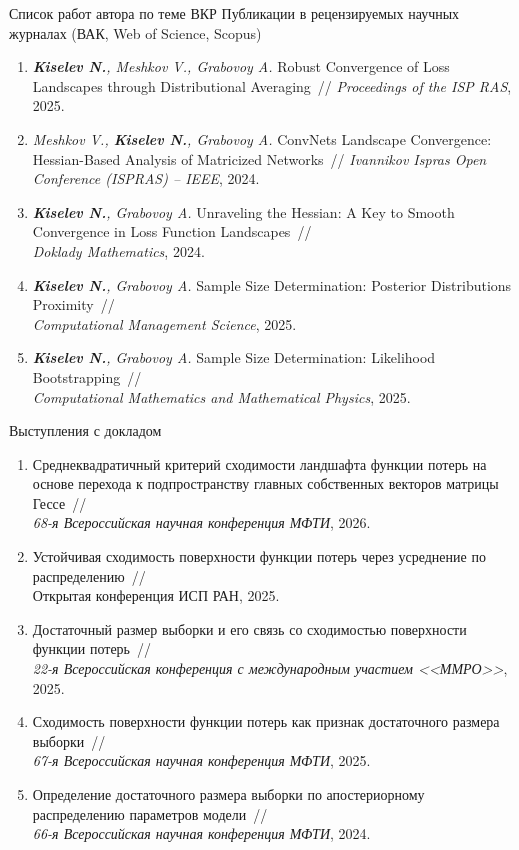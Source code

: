 \documentclass[aspectratio=169]{beamer}
\begin{document}
\begin{frame}{Список работ автора по теме ВКР}
    \scriptsize
    { Публикации в рецензируемых научных журналах (ВАК, Web of Science, Scopus)}\\
    \begin{enumerate}
        \item \textit{\textbf{Kiselev N.}, Meshkov V., Grabovoy A.} Robust Convergence of Loss Landscapes through Distributional Averaging~// \textit{Proceedings of the ISP RAS}, 2025.
        \item \textit{Meshkov V., \textbf{Kiselev N.}, Grabovoy A.} ConvNets Landscape Convergence: Hessian-Based Analysis of Matricized Networks~// \textit{Ivannikov Ispras Open Conference (ISPRAS) -- IEEE}, 2024.
        \item \textit{\textbf{Kiselev N.}, Grabovoy A.} Unraveling the Hessian: A Key to Smooth Convergence in Loss Function Landscapes~//\\\textit{Doklady Mathematics}, 2024.
        \item \textit{\textbf{Kiselev N.}, Grabovoy A.} Sample Size Determination: Posterior Distributions Proximity~//\\\textit{Computational Management Science}, 2025.
        \item \textit{\textbf{Kiselev N.}, Grabovoy A.} Sample Size Determination: Likelihood Bootstrapping~//\\\textit{Computational Mathematics and Mathematical Physics}, 2025.
    \end{enumerate}
    { Выступления с докладом}\\
    \begin{enumerate}
        \item Среднеквадратичный критерий сходимости ландшафта функции потерь на основе перехода к подпространству главных собственных векторов матрицы Гессе~//\\\textit{68-я Всероссийская научная конференция МФТИ}, 2026.
        \item Устойчивая сходимость поверхности функции потерь через усреднение по распределению~//\\Открытая конференция ИСП РАН, 2025.
        \item Достаточный размер выборки и его связь со сходимостью поверхности функции потерь~//\\\textit{22-я Всероссийская конференция с международным участием <<ММРО>>}, 2025.
        \item Сходимость поверхности функции потерь как признак достаточного размера выборки~//\\\textit{67-я Всероссийская научная конференция МФТИ}, 2025.
        \item Определение достаточного размера выборки по апостериорному распределению параметров модели~//\\\textit{66-я Всероссийская научная конференция МФТИ}, 2024.
    \end{enumerate}
\end{frame}
\end{document}
